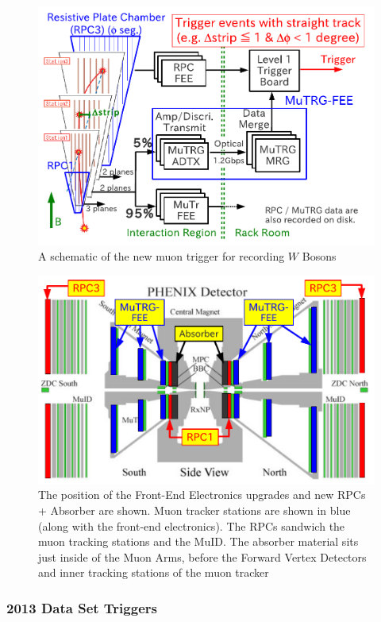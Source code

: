 \begin{figure}[ht]
  \centering
  \includegraphics[width=0.8\linewidth]{./figures/new_muon_trigger.png}
  \caption{
    A schematic of the new muon trigger for recording
    $W$ Bosons~\cite{Fukao2011}
  }
  \label{fig:new_muon_trigger}
\end{figure}

\begin{figure}[ht]
  \centering
  \includegraphics[width=0.8\linewidth]{./figures/muon_arms_upgrades.png}
  \caption{
    The position of the Front-End Electronics upgrades and new RPCs + Absorber
    are shown. Muon tracker stations are shown in blue (along with the front-end
    electronics). The RPCs sandwich the muon tracking stations and the MuID.
    The absorber material sits just inside of the Muon Arms, before the Forward
    Vertex Detectors and inner tracking stations of the muon
    tracker~\cite{Fukao2011}
  }
  \label{fig:muon_arms_upgrades}

\end{figure}

\subsubsection{2013 Data Set Triggers}

